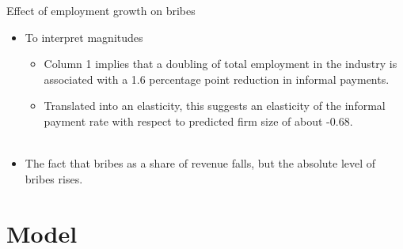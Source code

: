\documentclass{beamer}
\begin{document}
\begin{frame}{Effect of employment growth on bribes}
\begin{itemize}
\item To interpret magnitudes
\begin{itemize}
\item Column 1 implies that a doubling of total employment in the industry is associated with a 1.6 percentage point reduction in informal payments.
\item Translated into an elasticity, this suggests an elasticity of the informal payment rate with respect to predicted firm size of about -0.68.\\~
\end{itemize}

\item The fact that bribes as a share of revenue falls, but the absolute level of bribes rises.

\end{itemize}

\end{frame}

\section{Model}
\end{document}

